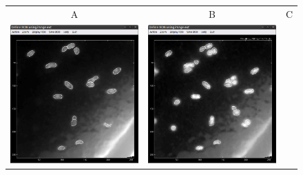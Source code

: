 \def\scf{0.22}
\begin{figure}[!ht]
\centering
\begin{tabular}{ccc}
A & B & C \\
\includegraphics[scale=\scf]{figs7/LANS-ext-ROIs1}
&
\includegraphics[scale=\scf]{figs7/LANS-ext-ROIs2}

\end{tabular}
\end{figure}
